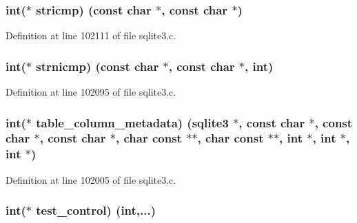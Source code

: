 \subsubsection[{stricmp}]{\setlength{\rightskip}{0pt plus 5cm}int($\ast$ stricmp) (const char $\ast$, const char $\ast$)}\label{structsqlite3__api__routines_a4a4d0359c8a7c68edb15957cf45c0082}


Definition at line 102111 of file sqlite3.\+c.

\hypertarget{structsqlite3__api__routines_a4cb03ff57968d95f6b082e7f1484a921}{}
\subsubsection[{strnicmp}]{\setlength{\rightskip}{0pt plus 5cm}int($\ast$ strnicmp) (const char $\ast$, const char $\ast$, int)}\label{structsqlite3__api__routines_a4cb03ff57968d95f6b082e7f1484a921}


Definition at line 102095 of file sqlite3.\+c.

\hypertarget{structsqlite3__api__routines_a63d4de3a8546d4b0f6c7d88bc786c89c}{}
\subsubsection[{table\+\_\+column\+\_\+metadata}]{\setlength{\rightskip}{0pt plus 5cm}int($\ast$ table\+\_\+column\+\_\+metadata) ({\bf sqlite3} $\ast$, const char $\ast$, const char $\ast$, const char $\ast$, char const $\ast$$\ast$, char const $\ast$$\ast$, int $\ast$, int $\ast$, int $\ast$)}\label{structsqlite3__api__routines_a63d4de3a8546d4b0f6c7d88bc786c89c}


Definition at line 102005 of file sqlite3.\+c.

\hypertarget{structsqlite3__api__routines_a8c973156a0d2c8339ceac7f599102368}{}
\subsubsection[{test\+\_\+control}]{\setlength{\rightskip}{0pt plus 5cm}int($\ast$ test\+\_\+control) (int,...)}\label{structsqlite3__api__routines_a8c973156a0d2c8339ceac7f599102368}


